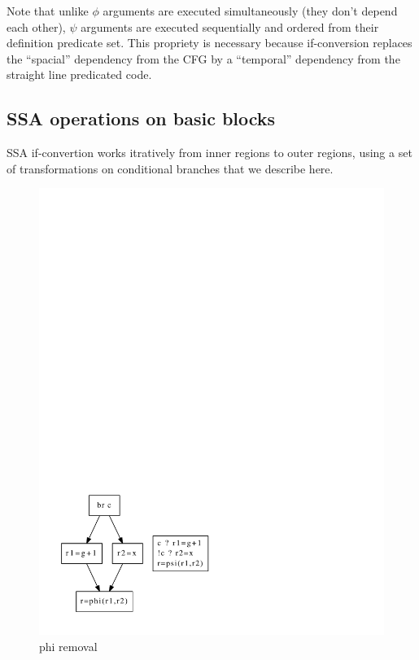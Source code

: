 Note that unlike $\phi$ arguments are executed simultaneously (they don't depend each other), $\psi$ arguments are executed sequentially and ordered from their definition predicate set. This propriety is necessary because if-conversion replaces the ``spacial'' dependency from the CFG by a ``temporal'' dependency from the straight line predicated code.

\subsection{SSA operations on basic blocks}

SSA if-convertion works itratively from inner regions to outer regions, using a set of transformations on conditional branches that we describe here.

\begin{figure}
\begin{minipage}[t]{5cm}
\includegraphics[scale=0.4]{phi_removal.pdf}
\caption{phi removal}
\label{fig:phi_rem}
\end{minipage}

\end{figure}
